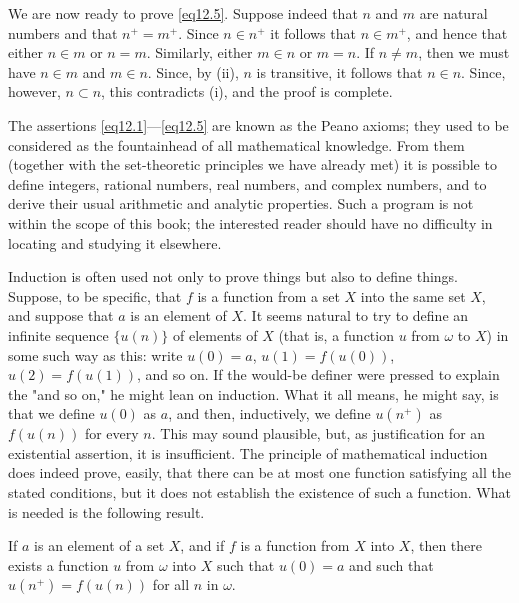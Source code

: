 We are now ready to prove \eqref{eq12.5}. Suppose indeed that $n$ and $m$ are natural numbers and that $n^{+} = m^{+}$. Since $n \in n^{+}$ it follows that $n \in m^{+}$, and hence that either $n \in m$ or $n = m$. Similarly, either $m \in n$ or $m = n$. If $n \neq m$, then we must have $n \in m$ and $m \in n$. Since, by (ii), $n$ is transitive, it follows that $n \in n$. Since, however, $n \subset n$, this contradicts (i), and the proof is complete. 

The assertions \eqref{eq12.1}—\eqref{eq12.5} are known as the Peano axioms; they used to be considered as the fountainhead of all mathematical knowledge. From them (together with the set-theoretic principles we have already met) it is possible to define integers, rational numbers, real numbers, and complex numbers, and to derive their usual arithmetic and analytic  properties. Such a program is not within the scope of this book; the interested reader should have no difficulty in locating and studying it elsewhere.

Induction is often used not only to prove things but also to define things. Suppose, to be specific, that $f$ is a function from a set $X$ into the same set $X$, and suppose that $a$ is an element of $X$. It seems natural to try to define an infinite sequence $\{ u(n) \}$ of elements of $X$ (that is, a function $u$ from $\omega$ to $X$) in some such way as this: write $u(0) = a$, $u(1) = f(u(0))$, $u(2) = f(u(1))$, and so on. If the would-be definer were pressed to explain the "and so on," he might lean on induction. What it all means, he might say, is that we define $u(0)$ as $a$, and then, inductively, we define $u(n^{+})$ as $f(u(n))$ for every $n$. This may sound plausible, but, as justification for an existential assertion, it is insufficient. The principle of mathematical induction does indeed prove, easily, that there can be at most one function satisfying all the stated conditions, but it does not establish the existence of such a function. What is needed is the following result.

\begin{named} If $a$ is an element of a set $X$, and if $f$ is a function from $X$ into $X$, then there exists a function $u$ from $\omega$ into $X$ such that $u(0) = a$ and such that $u(n^{+}) = f(u(n))$ for all $n$ in $\omega$. 
\end{named}

